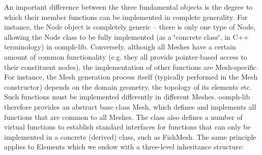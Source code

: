 An important difference between the three fundamental objects is the degree to which their member functions can be implemented in complete generality. For instance, the Node object is completely generic -- there is only one type of Node, allowing the Node class to be fully implemented (as a \char`\"{}concrete class\char`\"{}, in C++ terminology) in {\ttfamily oomph-\/lib}. Conversely, although all Meshes have a certain amount of common functionality (e.\-g. they all provide pointer-\/based access to their constituent nodes), the implementation of other functions are Mesh-\/specific. For instance, the Mesh generation process itself (typically performed in the Mesh constructor) depends on the domain geometry, the topology of its elements etc. Such functions must be implemented differently in different Meshes. {\ttfamily oomph-\/lib} therefore provides an abstract base class {\ttfamily Mesh}, which defines and implements all functions that are common to all Meshes. The class also defines a number of virtual functions to establish standard interfaces for functions that can only be implemented in a concrete (derived) class, such as {\ttfamily Fish\-Mesh}. The same principle applies to Elements which we endow with a three-\/level inheritance structure\-:
